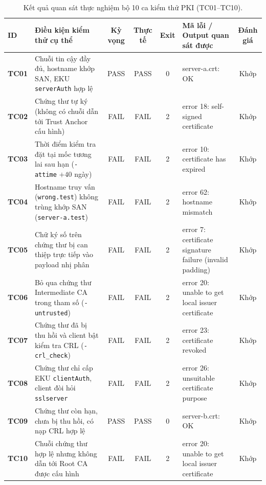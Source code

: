 \begin{table}[!htbp]
\centering
\small
\renewcommand{\arraystretch}{1.12}
\setlength{\tabcolsep}{3.5pt}
\begin{tabularx}{\textwidth}{l >{\raggedright\arraybackslash}p{3.8cm} c c c >{\raggedright\arraybackslash\ttfamily\scriptsize}X c}
\toprule
\textbf{ID} & \textbf{Điều kiện kiểm thử cụ thể} & \textbf{Kỳ vọng} & \textbf{Thực tế} & \textbf{Exit} & \textrm{\textbf{Mã lỗi / Output quan sát được}} & \textbf{Đánh giá} \\
\midrule
\textbf{TC01} & Chuỗi tin cậy đầy đủ, hostname khớp SAN, EKU \texttt{serverAuth} hợp lệ & PASS & PASS & 0 & server-a.crt: OK & Khớp \\
\midrule
\textbf{TC02} & Chứng thư tự ký (không có chuỗi dẫn tới Trust Anchor cấu hình) & FAIL & FAIL & 2 & error 18: self-signed certificate & Khớp \\
\midrule
\textbf{TC03} & Thời điểm kiểm tra đặt tại mốc tương lai sau hạn (\texttt{-attime} $+40$ ngày) & FAIL & FAIL & 2 & error 10: certificate has expired & Khớp \\
\midrule
\textbf{TC04} & Hostname truy vấn (\texttt{wrong.test}) không trùng khớp SAN (\texttt{server-a.test}) & FAIL & FAIL & 2 & error 62: hostname mismatch & Khớp \\
\midrule
\textbf{TC05} & Chữ ký số trên chứng thư bị can thiệp trực tiếp vào payload nhị phân & FAIL & FAIL & 2 & error 7: certificate signature failure (invalid padding) & Khớp \\
\midrule
\textbf{TC06} & Bỏ qua chứng thư Intermediate CA trong tham số (\texttt{-untrusted}) & FAIL & FAIL & 2 & error 20: unable to get local issuer certificate & Khớp \\
\midrule
\textbf{TC07} & Chứng thư đã bị thu hồi và client bật kiểm tra CRL (\texttt{-crl\_check}) & FAIL & FAIL & 2 & error 23: certificate revoked & Khớp \\
\midrule
\textbf{TC08} & Chứng thư chỉ cấp EKU \texttt{clientAuth}, client đòi hỏi \texttt{sslserver} & FAIL & FAIL & 2 & error 26: unsuitable certificate purpose & Khớp \\
\midrule
\textbf{TC09} & Chứng thư còn hạn, chưa bị thu hồi, có nạp CRL hợp lệ & PASS & PASS & 0 & server-b.crt: OK & Khớp \\
\midrule
\textbf{TC10} & Chuỗi chứng thư hợp lệ nhưng không dẫn tới Root CA được cấu hình & FAIL & FAIL & 2 & error 20: unable to get local issuer certificate & Khớp \\
\bottomrule
\end{tabularx}
\caption{Kết quả quan sát thực nghiệm bộ 10 ca kiểm thử PKI (TC01--TC10).}
\label{tab:exp-results}
\end{table}
